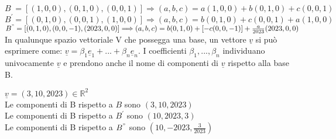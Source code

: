 \begin{proposizione}
	\phantom{}\\
	$B^{\phantom{'}}=[(1,0,0),(0,1,0),(0,0,1)]\Longrightarrow (a,b,c)=a(1,0,0)+b(0,1,0)+c(0,0,1)$\\
	$B^{'}=[(0,1,0),(0,0,1),(1,0,0)]\Longrightarrow (a,b,c)=b(0,1,0)+c(0,0,1)+a(1,0,0)$\\
	$B^{"}=[(0,1,0),(0,0,-1),(2023,0,0)]\Longrightarrow (a,b,c)=b(0,1,0)+[-c(0,0,-1)]+\frac{a}{2023}(2023,0,0)$\\
	In qualunque spazio vettoriale V che possegga una base, un vettore $\underline{v}$ si può esprimere come: $\underline{v}=\beta_1\underline{e}_1+...+\beta_n\underline{e}_n$. I coefficienti $\beta_1,...,\beta_n$ individuano univocamente $\underline{v}$ e prendono anche il nome di componenti di $\underline{v}$ rispetto alla base B.
	\begin{es}
		$\underline{v}=(3,10,2023)\in\mathbb{R}^{2}$\\
		Le componenti di B rispetto a $B$ sono $(3,10,2023)$\\
		Le componenti di B rispetto a $B^{'}$ sono $(10,2023,3)$\\
		Le componenti di B rispetto a $B^{"}$ sono $(10,-2023,\frac{3}{2023})$	
	\end{es}
\end{proposizione}
